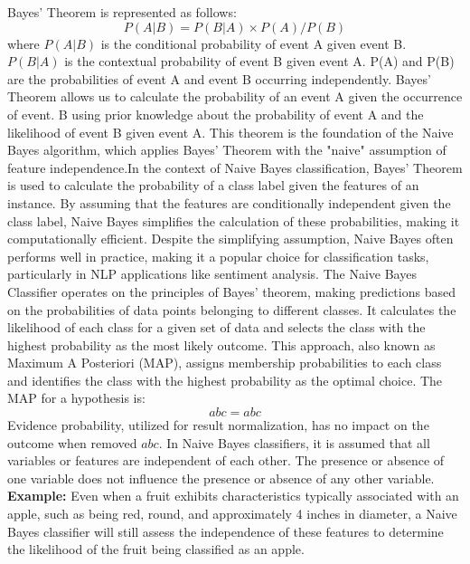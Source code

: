 Bayes' Theorem is represented as follows:
\begin{equation}
 P(A|B)= P(B|A)\times P(A)/P(B)   
\end{equation}
where $P(A|B)$
 is the conditional probability of event A given event B. $P(B|A)$
 is the contextual probability of event B given event A. P(A) and P(B) are the probabilities of event A and event B occurring independently.
Bayes' Theorem allows us to calculate the probability of an event A given the occurrence of event. B using prior knowledge about the probability of event 
A and the likelihood of event B given event A. This theorem is the foundation of the Naive Bayes algorithm, which applies Bayes' Theorem with the "naive" assumption of feature independence.In the context of Naive Bayes classification, Bayes' Theorem is used to calculate the probability of a class label given the features of an instance. By assuming that the features are conditionally independent given the class label, Naive Bayes simplifies the calculation of these probabilities, making it computationally efficient. Despite the simplifying assumption, Naive Bayes often performs well in practice, making it a popular choice for classification tasks, particularly in NLP applications like sentiment analysis.
The Naive Bayes Classifier operates on the principles of Bayes' theorem, making predictions based on the probabilities of data points belonging to different classes. It calculates the likelihood of each class for a given set of data and selects the class with the highest probability as the most likely outcome. This approach, also known as Maximum A Posteriori (MAP), assigns membership probabilities to each class and identifies the class with the highest probability as the optimal choice.
The MAP for a hypothesis is:
\begin{equation}
abc = abc
\end{equation}
Evidence probability, utilized for result normalization, has no impact on the outcome when removed $abc$.
In Naive Bayes classifiers, it is assumed that all variables or features are independent of each other. The presence or absence of one variable does not influence the presence or absence of any other variable.
\\
\textbf{Example:} Even when a fruit exhibits characteristics typically associated with an apple, such as being red, round, and approximately 4 inches in diameter, a Naive Bayes classifier will still assess the independence of these features to determine the likelihood of the fruit being classified as an apple.
\par
